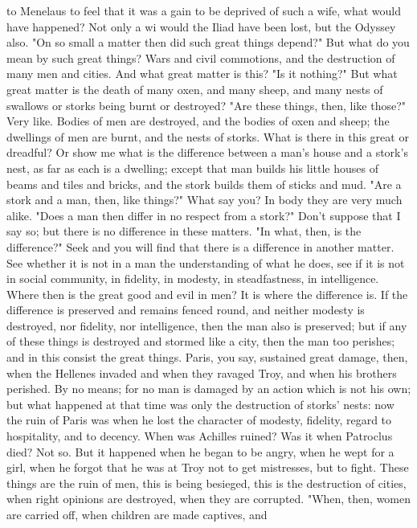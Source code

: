\documentclass[a4paper]{article}
\begin{document}
to Menelaus to feel that it was a gain to be deprived of such a wife, what
would have happened? Not only a wi would the Iliad have been lost, but the
Odyssey also. "On so small a matter then did such great things depend?" But
what do you mean by such great things? Wars and civil commotions, and the
destruction of many men and cities. And what great matter is this? "Is it
nothing?" But what great matter is the death of many oxen, and many sheep, and
many nests of swallows or storks being burnt or destroyed? "Are these things,
then, like those?" Very like. Bodies of men are destroyed, and the bodies of
oxen and sheep; the dwellings of men are burnt, and the nests of storks. What
is there in this great or dreadful? Or show me what is the difference between a
man's house and a stork's nest, as far as each is a dwelling; except that man
builds his little houses of beams and tiles and bricks, and the stork builds
them of sticks and mud. "Are a stork and a man, then, like things?" What say
you? In body they are very much alike.
    "Does a man then differ in no respect from a stork?" Don't suppose that I
say so; but there is no difference in these matters. "In what, then, is the
difference?" Seek and you will find that there is a difference in another
matter. See whether it is not in a man the understanding of what he does, see
if it is not in social community, in fidelity, in modesty, in steadfastness, in
intelligence. Where then is the great good and evil in men? It is where the
difference is. If the difference is preserved and remains fenced round, and
neither modesty is destroyed, nor fidelity, nor intelligence, then the man also
is preserved; but if any of these things is destroyed and stormed like a city,
then the man too perishes; and in this consist the great things. Paris, you
say, sustained great damage, then, when the Hellenes invaded and when they
ravaged Troy, and when his brothers perished. By no means; for no man is
damaged by an action which is not his own; but what happened at that time was
only the destruction of storks' nests: now the ruin of Paris was when he lost
the character of modesty, fidelity, regard to hospitality, and to decency. When
was Achilles ruined? Was it when Patroclus died? Not so. But it happened when
he began to be angry, when he wept for a girl, when he forgot that he was at
Troy not to get mistresses, but to fight. These things are the ruin of men,
this is being besieged, this is the destruction of cities, when right opinions
are destroyed, when they are corrupted.
    "When, then, women are carried off, when children are made captives, and
\end{document}
